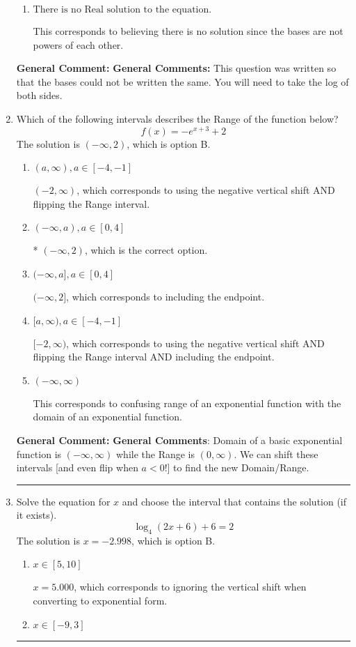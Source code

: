 \documentclass{extbook}[14pt]
\newcommand{\litem}[1]{\item #1

\rule{\textwidth}{0.4pt}}
\begin{document}
\begin{enumerate}
{\begin{enumerate}[label=\Alph*.]
* $x = -4.419$, which is the correct option.
\item \( \text{There is no Real solution to the equation.} \)

This corresponds to believing there is no solution since the bases are not powers of each other.
\end{enumerate}

\textbf{General Comment:} \textbf{General Comments:} This question was written so that the bases could not be written the same. You will need to take the log of both sides.
}
\litem{
Which of the following intervals describes the Range of the function below?
\[ f(x) = -e^{x+3}+2 \]The solution is \( (-\infty, 2) \), which is option B.\begin{enumerate}[label=\Alph*.]
\item \( (a, \infty), a \in [-4, -1] \)

$(-2, \infty)$, which corresponds to using the negative vertical shift AND flipping the Range interval.
\item \( (-\infty, a), a \in [0, 4] \)

* $(-\infty, 2)$, which is the correct option.
\item \( (-\infty, a], a \in [0, 4] \)

$(-\infty, 2]$, which corresponds to including the endpoint.
\item \( [a, \infty), a \in [-4, -1] \)

$[-2, \infty)$, which corresponds to using the negative vertical shift AND flipping the Range interval AND including the endpoint.
\item \( (-\infty, \infty) \)

This corresponds to confusing range of an exponential function with the domain of an exponential function.
\end{enumerate}

\textbf{General Comment:} \textbf{General Comments}: Domain of a basic exponential function is $(-\infty, \infty)$ while the Range is $(0, \infty)$. We can shift these intervals [and even flip when $a<0$!] to find the new Domain/Range.
}
\litem{
Solve the equation for $x$ and choose the interval that contains the solution (if it exists).
\[ \log_{4}{(2x+6)}+6 = 2 \]The solution is \( x = -2.998 \), which is option B.\begin{enumerate}[label=\Alph*.]
\item \( x \in [5, 10] \)

$x = 5.000$, which corresponds to ignoring the vertical shift when converting to exponential form.
\item \( x \in [-9, 3] \)


\end{enumerate}}
\end{enumerate}
\end{document}
